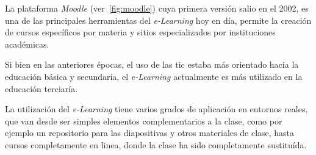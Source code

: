 La plataforma \emph{Moodle} (ver~\ref{fig:moodle}) cuya primera versión salio en
el 2002, es una de las principales herramientas del \emph{e-Learning} hoy en
día, permite la creación de cursos específicos por materia y sitios
especializados por instituciones académicas\cite{perkins2006using}. 

Si bien en las anteriores épocas, el uso de las \Gls{tic} estaba más orientado
hacia la educación básica y secundaría, el \emph{e-Learning} actualmente es más
utilizado en la educación terciaría\cite{punie:ict}.

La utilización del \emph{e-Learning} tiene varios grados de aplicación en
entornos reales\cite{punie:ict}, que van desde ser simples elementos
complementarios a la clase, como por ejemplo un repositorio para las
diapositivas y otros materiales de clase, hasta cursos completamente en linea,
donde la clase ha sido completamente sustituída.

